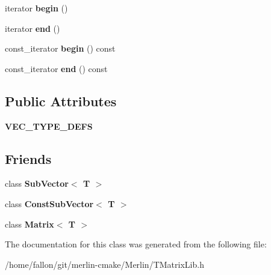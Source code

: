 \begin{DoxyCompactItemize}
iterator {\bfseries begin} ()
\item 
\mbox{\label{classTLAS_1_1Vector_aa6fd84d5ce9792005ad1cb25088835a7}} 
iterator {\bfseries end} ()
\item 
\mbox{\label{classTLAS_1_1Vector_a1e2894d7e4831ee2383c57a79112fe6f}} 
const\+\_\+iterator {\bfseries begin} () const
\item 
\mbox{\label{classTLAS_1_1Vector_a0bf02b86ef83f993c90a573055633417}} 
const\+\_\+iterator {\bfseries end} () const
\end{DoxyCompactItemize}
\subsection*{Public Attributes}
\begin{DoxyCompactItemize}
\item 
\mbox{\label{classTLAS_1_1Vector_a778bcbf4de139491f3eb19afd2491080}} 
{\bfseries V\+E\+C\+\_\+\+T\+Y\+P\+E\+\_\+\+D\+E\+FS}
\end{DoxyCompactItemize}
\subsection*{Friends}
\begin{DoxyCompactItemize}
\item 
\mbox{\label{classTLAS_1_1Vector_ae8eafab737fa8fc043dfc78dbbc714e9}} 
class {\bfseries Sub\+Vector$<$ T $>$}
\item 
\mbox{\label{classTLAS_1_1Vector_a21a6ef43038032d31a396de8c1e9aefe}} 
class {\bfseries Const\+Sub\+Vector$<$ T $>$}
\item 
\mbox{\label{classTLAS_1_1Vector_a17fc06682c9f9c46f1e0e38b7af25b80}} 
class {\bfseries Matrix$<$ T $>$}
\end{DoxyCompactItemize}


The documentation for this class was generated from the following file\+:\begin{DoxyCompactItemize}
\item 
/home/fallon/git/merlin-\/cmake/\+Merlin/T\+Matrix\+Lib.\+h\end{DoxyCompactItemize}
